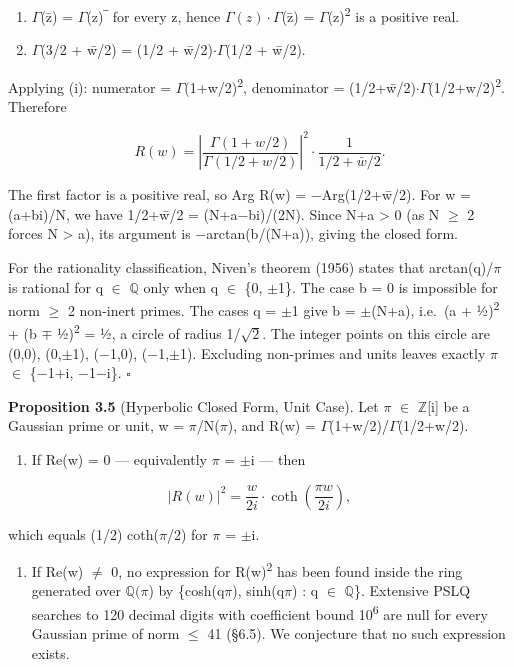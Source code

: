 \documentclass[11pt]{article}
\providecommand{\tightlist}{\setlength{\itemsep}{0pt}\setlength{\parskip}{0pt}}
\begin{document}
\begin{enumerate}
\def\labelenumi{(\roman{enumi})}
\item
  \(\Gamma\)(z̄) = \(\Gamma\)(z)‾ for every z, hence
  \(\Gamma(z)\cdot \Gamma\)(z̄) =
  \textbar{}\(\Gamma\)(z)\textbar{}\textsuperscript{2} is a positive
  real.
\item
  \(\Gamma\)(3/2 + w̄/2) = (1/2 + w̄/2)\(\cdot \Gamma\)(1/2 + w̄/2).
\end{enumerate}

Applying (i): numerator =
\textbar{}\(\Gamma\)(1+w/2)\textbar{}\textsuperscript{2}, denominator =
(1/2+w̄/2)\(\cdot\)\textbar{}\(\Gamma\)(1/2+w/2)\textbar{}\textsuperscript{2}.
Therefore

\[R(w) = \left|\frac{\Gamma(1+w/2)}{\Gamma(1/2+w/2)}\right|^2 \cdot \frac{1}{1/2+\bar{w}/2}.\]

The first factor is a positive real, so Arg R(w) = −Arg(1/2+w̄/2). For w
= (a+bi)/N, we have 1/2+w̄/2 = (N+a−bi)/(2N). Since N+a \textgreater{} 0
(as N \(\geq\) 2 forces N \textgreater{} \textbar a\textbar), its
argument is −arctan(b/(N+a)), giving the closed form.

For the rationality classification, Niven's theorem (1956) states that
arctan(q)/\(\pi\) is rational for q \(\in\) \(\mathbb{Q}\) only when q
\(\in\) \{0, \(\pm\)1\}. The case b = 0 is impossible for norm \(\geq\)
2 non-inert primes. The cases q = \(\pm\)1 give b = \(\pm\)(N+a),
i.e.~(a + ½)\textsuperscript{2} + (b \(\mp\) ½)\textsuperscript{2} = ½,
a circle of radius 1/\(\sqrt{2}\). The integer points on this circle are
(0,0), (0,\(\pm\)1), (−1,0), (−1,\(\pm\)1). Excluding non-primes and
units leaves exactly \(\pi\) \(\in\) \{−1+i, −1−i\}. \(\square\)

\textbf{Proposition 3.5} (Hyperbolic Closed Form, Unit Case). Let
\(\pi\) \(\in\) \(\mathbb{Z}\){[}i{]} be a Gaussian prime or unit, w =
\(\pi\)/N(\(\pi\)), and R(w) = \(\Gamma\)(1+w/2)/\(\Gamma\)(1/2+w/2).

\begin{enumerate}
\def\labelenumi{(\alph{enumi})}
\tightlist
\item
  If Re(w) = 0 --- equivalently \(\pi\) = \(\pm\)i --- then
\end{enumerate}

\[|R(w)|^2 = \frac{w}{2i} \cdot \coth\!\left(\frac{\pi w}{2i}\right),\]

which equals (1/2) coth(\(\pi\)/2) for \(\pi\) = \(\pm\)i.

\begin{enumerate}
\def\labelenumi{(\alph{enumi})}
\setcounter{enumi}{1}
\tightlist
\item
  If Re(w) \(\neq\) 0, no expression for
  \textbar R(w)\textbar{}\textsuperscript{2} has been found inside the
  ring generated over \(\mathbb{Q}(\pi\)) by \{cosh(q\(\pi\)),
  sinh(q\(\pi\)) : q \(\in\) \(\mathbb{Q}\)\}. Extensive PSLQ searches
  to 120 decimal digits with coefficient bound 10\textsuperscript{6} are
  null for every Gaussian prime of norm \(\leq\) 41 (§6.5). We
  conjecture that no such expression exists.
\end{enumerate}
\end{document}
